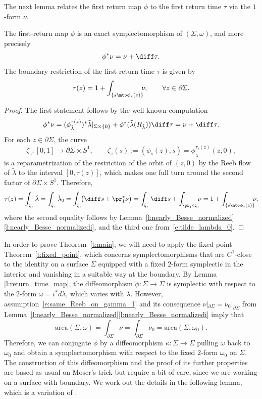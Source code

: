 The next lemma relates the first return map $\phi$ to the first return time $\tau$ via the $1$-form $\nu$.

\begin{lem}
\label{l:return_time_map}
The first-return map $\phi$ is an exact symplectomorphism of $(\Sigma,\omega)$, and more precisely
\[
\phi^*\nu =\nu+\diff\tau.
\]
The boundary restriction of the first return time $\tau$ is given by
\[
\tau(z)=1+\int_{\{s\mto \phi_s(z)\}} \!\!\! \nu,\qquad\forall z\in\partial\Sigma.
\]
\end{lem}

\begin{proof}
The first statement follows by the well-known computation
\[
\phi^*\nu = (\phi_{\tilde\lambda}^{\tau(z)})^*\tilde\lambda|_{\Sigma\times\{0\}} + \phi^*(\tilde\lambda(R_{\tilde\lambda}))\diff\tau=\nu+\diff\tau.
\]
For each $z\in\partial\Sigma$, the curve
\[
\zeta_z:[0,1]\to \partial\Sigma\times S^1,\qquad \zeta_z(s):=(\phi_s(z),s) = \phi_{\tilde{\lambda}}^{\tau_s(z)} (z,0),
\]
is a reparametrization of the restriction of the orbit of $(z,0)$ by the Reeb flow of $\tilde{\lambda}$ to the interval $[0,\tau(z)]$, which makes one full turn around the second factor of $\partial\Sigma\times S^1$. Therefore,
\[
\tau(z)
=\int_{\zeta_z} \tilde\lambda
=\int_{\zeta_z} \tilde\lambda_0
=\int_{\zeta_z} \!\!\big( \diff s + \pr_1^*\nu \big)
=\int_{\zeta_z} \diff s + \int_{\pr_1\circ\zeta_z} \!\!\!\nu
=1 + \int_{\{s\mto \phi_s(z)\}}\!\!\! \nu,
\]
where the second equality follows by Lemma~\ref{l:nearly_Besse_normalized}\eqref{l:nearly_Besse_normalizedi}, and the third one from~\eqref{e:tilde_lambda_0}.
\end{proof}

In order to prove Theorem~\ref{t:main}, we will need to apply the fixed point Theorem~\ref{t:fixed_point}, which concerns symplectomorphisms that are $C^1$-close to the identity on a surface $\Sigma$ equipped with a fixed $2$-form symplectic in the interior and vanishing in a suitable way at the boundary. By Lemma \ref{l:return_time_map}, the diffeomorphism $\phi: \Sigma \to \Sigma$ is symplectic with respect to the $2$-form $\omega=\iota^* d\lambda$, which varies with $\lambda$. However, assumption~\eqref{e:same_Reeb_on_gamma_1} and its consequence $\nu|_{\partial \Sigma} = \nu_0|_{\partial \Sigma}$ from Lemma~\ref{l:nearly_Besse_normalized}\eqref{l:nearly_Besse_normalizedi} imply that
\[
\mathrm{area}(\Sigma,\omega) = \int_{\partial \Sigma} \nu = \int_{\partial \Sigma} \nu_0 = \mathrm{area}(\Sigma,\omega_0).
\]
Therefore, we can conjugate $\phi$ by a diffeomorphism $\kappa: \Sigma\to \Sigma$ pulling $\omega$ back to~$\omega_0$ and obtain a symplectomorphism with respect to the fixed $2$-form $\omega_0$ on $\Sigma$. The construction of this diffeomorphism and the proof of its further properties are based as usual on Moser's trick but require a bit of care, since we are working on a surface with boundary. We work out the details in the following lemma, which is a variation of \cite[Prop.\,3.9]{Benedetti:2021aa}.


